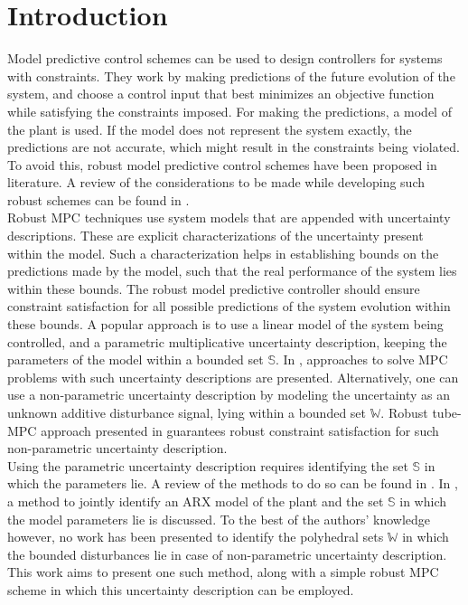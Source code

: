 \documentclass[letterpaper, 10 pt, conference]{ieeeconf}  %
\begin{document}
\section{Introduction}
Model predictive control schemes can be used to design controllers for systems with constraints. They work by making predictions of the future evolution of the system, and choose a control input that best minimizes an objective function while satisfying the constraints imposed. For making the predictions, a model of the plant is used. If the model does not represent the system exactly, the predictions are not accurate, which might result in the constraints being violated. To avoid this, robust model predictive control schemes have been proposed in literature. A review of the considerations to be made while developing such robust schemes can be found in \cite{10.1007/BFb0109870}.
 \\ \indent
 Robust MPC techniques use system models that are appended with uncertainty descriptions.
 These are explicit characterizations of the uncertainty present within the model. Such a characterization helps in establishing bounds on the predictions made by the model, such that the real performance of the system lies within these bounds. The robust model predictive controller should ensure constraint satisfaction for all possible predictions of the system evolution within these bounds. A popular approach is to use a linear model of the system being controlled, and a parametric multiplicative uncertainty description, keeping the parameters of the model within a bounded set $\mathbb{S}$. In \cite{KOTHARE19961361}, approaches to solve MPC problems with such uncertainty descriptions are presented. Alternatively, one can use a non-parametric uncertainty description by modeling the uncertainty as an unknown additive disturbance signal, lying within a bounded set $\mathbb{W}$. Robust tube-MPC approach presented in \cite{MAYNE2005219} guarantees robust constraint satisfaction for such non-parametric uncertainty description.
 \\
 \indent
 Using the parametric uncertainty description requires identifying the set $\mathbb{S}$ in which the parameters lie. A review of the methods to do so can be found in \cite{WALTER1990449}. In \cite{7330793}, a method to jointly identify an ARX model of the plant and the set $\mathbb{S}$ in which the model parameters lie is discussed. To the best of the authors' knowledge however, no work has been presented to identify the polyhedral sets $\mathbb{W}$ in which the bounded disturbances lie in case of non-parametric uncertainty description. This work aims to present one such method, along with a simple robust MPC scheme in which this uncertainty description can be employed. 
\end{document}
